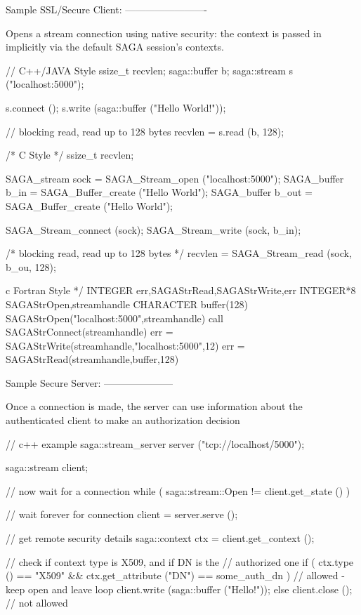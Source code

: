 \begin{mycode}
  Sample SSL/Secure Client:
  -------------------------
 
    Opens a stream connection using native security: the 
    context is passed in implicitly via the default SAGA
    session's contexts.
 
    // C++/JAVA Style
       ssize_t recvlen;
       saga::buffer b;
       saga::stream s ("localhost:5000");
 
       s.connect ();
       s.write   (saga::buffer ("Hello World!"));
 
       // blocking read, read up to 128 bytes
       recvlen = s.read (b, 128);
 
 
    /* C Style */
       ssize_t recvlen;
 
       SAGA_stream sock  = SAGA_Stream_open ("localhost:5000");
       SAGA_buffer b_in  = SAGA_Buffer_create ("Hello World");
       SAGA_buffer b_out = SAGA_Buffer_create ("Hello World");
 
       SAGA_Stream_connect (sock);
       SAGA_Stream_write   (sock, b_in);
 
       /* blocking read, read up to 128 bytes */
       recvlen = SAGA_Stream_read (sock, b_ou, 128);
 
 
     c  Fortran Style */
        INTEGER   err,SAGAStrRead,SAGAStrWrite,err
        INTEGER*8 SAGAStrOpen,streamhandle
        CHARACTER buffer(128)
        SAGAStrOpen("localhost:5000",streamhandle)
        call SAGAStrConnect(streamhandle)
        err = SAGAStrWrite(streamhandle,"localhost:5000",12)
        err = SAGAStrRead(streamhandle,buffer,128)
 
 
  Sample Secure Server:
  ---------------------
 
    Once a connection is made, the server can use information
    about the authenticated client to make an authorization
    decision
 
     // c++ example
        saga::stream_server server ("tcp://localhost/5000");
 
        saga::stream client;
 
        // now wait for a connection
        while ( saga::stream::Open != client.get_state () )
        {
          // wait forever for connection
          client = server.serve ();
 
          // get remote security details
          saga::context ctx = client.get_context ();
 
          // check if context type is X509, and if DN is the
          // authorized one
          if ( ctx.type ()              == "X509"       &&
               ctx.get_attribute ("DN") == some_auth_dn )
          {
            // allowed - keep open and leave loop
            client.write (saga::buffer ("Hello!"));
          }
          else
          {
            client.close (); // not allowed
          }
        } 
 

\end{mycode}
